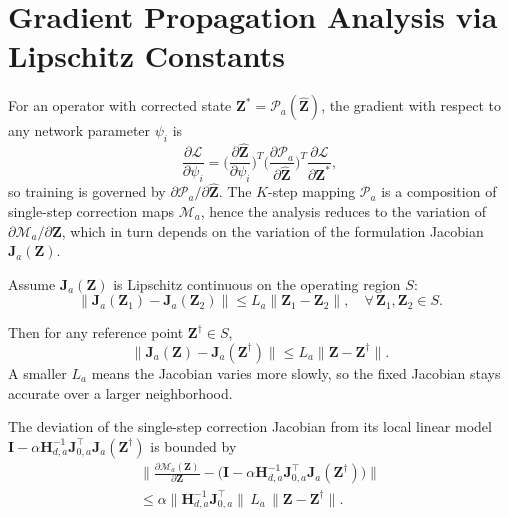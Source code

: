 \documentclass[journal]{IEEEtran}
\begin{document}
\section{Gradient Propagation Analysis via Lipschitz Constants}


For an operator with corrected state $\mathbf{Z}^{*}=\mathcal{P}_{a}(\hat{\mathbf{Z}})$, the gradient with respect to any network parameter $\psi_i$ is
\begin{equation}
\frac{\partial\mathcal{L}}{\partial\psi_i}
=\Big(\frac{\partial\hat{\mathbf{Z}}}{\partial\psi_i}\Big)^{\!T}\!
\Big(\frac{\partial\mathcal{P}_{a}}{\partial\hat{\mathbf{Z}}}\Big)^{\!T}
\frac{\partial\mathcal{L}}{\partial\mathbf{Z}^{*}},
\end{equation}
so training is governed by $\partial\mathcal{P}_{a}/\partial\hat{\mathbf{Z}}$. The $K$-step mapping $\mathcal{P}_{a}$ is a composition of single-step correction maps $\mathcal{M}_{a}$, hence the analysis reduces to the variation of $\partial\mathcal{M}_{a}/\partial\mathbf{Z}$, which in turn depends on the variation of the formulation Jacobian $\mathbf{J}_{a}(\mathbf{Z})$.

Assume $\mathbf{J}_{a}(\mathbf{Z})$ is Lipschitz continuous on the operating region $S$:
\begin{equation}
\|\mathbf{J}_{a}(\mathbf{Z}_1)-\mathbf{J}_{a}(\mathbf{Z}_2)\|
\leq L_{a}\|\mathbf{Z}_1-\mathbf{Z}_2\|,
\quad\forall\,\mathbf{Z}_1,\mathbf{Z}_2\in S.
\end{equation}

Then for any reference point $\mathbf{Z}^\dagger\in S$,
\begin{equation}
\|\mathbf{J}_{a}(\mathbf{Z})-\mathbf{J}_{a}(\mathbf{Z}^\dagger)\|\leq L_{a}\|\mathbf{Z}-\mathbf{Z}^\dagger\|.
\end{equation}
A smaller $L_{a}$ means the Jacobian varies more slowly, so the fixed Jacobian stays accurate over a larger neighborhood.

The deviation of the single-step correction Jacobian from its local linear model $\mathbf{I}-\alpha\mathbf{H}_{d,a}^{-1}\mathbf{J}_{0,a}^{\top}\mathbf{J}_{a}(\mathbf{Z}^\dagger)$ is bounded by
\begin{multline}
\Big\|\frac{\partial\mathcal{M}_{a}(\mathbf{Z})}{\partial\mathbf{Z}}
-\big(\mathbf{I}-\alpha\mathbf{H}_{d,a}^{-1}\mathbf{J}_{0,a}^{\top}\mathbf{J}_{a}(\mathbf{Z}^\dagger)\big)\Big\| \\
\leq\alpha\|\mathbf{H}_{d,a}^{-1}\mathbf{J}_{0,a}^{\top}\|\,L_{a}\,\|\mathbf{Z}-\mathbf{Z}^\dagger\|.
\end{multline}
\end{document}
